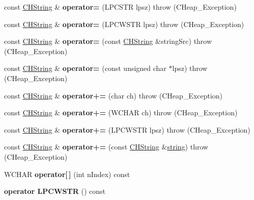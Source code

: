 \begin{DoxyCompactItemize}
const \hyperlink{class_c_h_string}{C\+H\+String} \& {\bfseries operator=} (L\+P\+C\+S\+TR lpsz)  throw (\+C\+Heap\+\_\+\+Exception)
\item 
\mbox{\label{class_c_h_string_ad976dd21e8465d3278eb62c09ad16fe2}} 
const \hyperlink{class_c_h_string}{C\+H\+String} \& {\bfseries operator=} (L\+P\+C\+W\+S\+TR lpsz)  throw (\+C\+Heap\+\_\+\+Exception)
\item 
\mbox{\label{class_c_h_string_ae3d4692038ae88efcc437646f6bb4f06}} 
const \hyperlink{class_c_h_string}{C\+H\+String} \& {\bfseries operator=} (const \hyperlink{class_c_h_string}{C\+H\+String} \&string\+Src)  throw (\+C\+Heap\+\_\+\+Exception)
\item 
\mbox{\label{class_c_h_string_a29721ef6b33d5cde49a0a7a6541652f2}} 
const \hyperlink{class_c_h_string}{C\+H\+String} \& {\bfseries operator=} (const unsigned char $\ast$lpsz)  throw (\+C\+Heap\+\_\+\+Exception)
\item 
\mbox{\label{class_c_h_string_a1f0d77b7644e00345805de3d42fd63f9}} 
const \hyperlink{class_c_h_string}{C\+H\+String} \& {\bfseries operator+=} (char ch)  throw (\+C\+Heap\+\_\+\+Exception)
\item 
\mbox{\label{class_c_h_string_abdc63008c3da713bf7805c847de9bbf6}} 
const \hyperlink{class_c_h_string}{C\+H\+String} \& {\bfseries operator+=} (W\+C\+H\+AR ch)  throw (\+C\+Heap\+\_\+\+Exception)
\item 
\mbox{\label{class_c_h_string_a33f175b1ac821acb6c30352bb326911b}} 
const \hyperlink{class_c_h_string}{C\+H\+String} \& {\bfseries operator+=} (L\+P\+C\+W\+S\+TR lpsz)  throw (\+C\+Heap\+\_\+\+Exception)
\item 
\mbox{\label{class_c_h_string_a6e8ea4d649c8eb482341ae94be2dd08b}} 
const \hyperlink{class_c_h_string}{C\+H\+String} \& {\bfseries operator+=} (const \hyperlink{class_c_h_string}{C\+H\+String} \&\hyperlink{structstring}{string})  throw (\+C\+Heap\+\_\+\+Exception)
\item 
\mbox{\label{class_c_h_string_a8342d7f20a806f3b225599abdcb297ab}} 
W\+C\+H\+AR {\bfseries operator\mbox{[}$\,$\mbox{]}} (int n\+Index) const
\item 
\mbox{\label{class_c_h_string_a021cca86a08eeaf091f41cc81ceeac2f}} 
{\bfseries operator L\+P\+C\+W\+S\+TR} () const
\end{DoxyCompactItemize}
